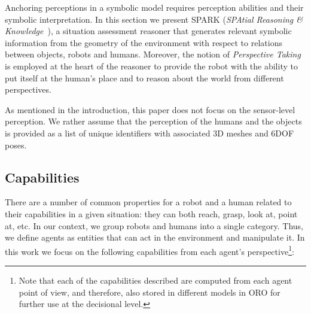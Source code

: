 \documentclass{svmult}
\begin{document}

Anchoring perceptions in a symbolic model requires perception abilities
and their symbolic interpretation. In this section we present
SPARK (\emph{SPAtial Reasoning \& Knowledge}~\cite{Sisbot2011}), a situation assessment reasoner
that generates relevant symbolic information from the geometry of the
environment with respect to relations between objects, robots and humans.
Moreover, the notion of \emph{Perspective
Taking}~\cite{Flavell1992,Tversky1999} is employed at the heart of the
reasoner to provide the robot with the ability to put itself at the human's
place and to reason about the world from different perspectives.

As mentioned in the introduction, this paper does not focus on the sensor-level
perception. We rather assume that the perception of the humans and the objects
is provided as a list of unique identifiers with associated 3D meshes and 6DOF
poses.

\subsection{Capabilities}

There are a number of common properties for a robot and a human related to
their capabilities in a given situation: they can both reach, grasp, look at,
point at, etc. In our context, we group robots and humans into a single category.
Thus, we define agents as entities that can act in the environment and
manipulate it. In this work we focus on the following capabilities from each
agent's perspective\footnote{Note that each of the capabilities described are
computed from each agent point of view, and therefore, also stored in different
models in ORO for further use at the decisional level.}:
\end{document}

